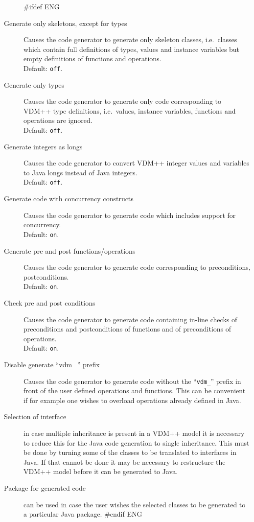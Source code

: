 \documentclass[\pformat,12pt]{article}
\begin{document}
\begin{description}

#ifdef ENG
\item[Generate only skeletons, except for types] Causes the code
  generator to generate only skeleton classes, i.e.\ classes which
  contain full definitions of types, values and instance variables but
  empty definitions of functions and operations. \\
  Default: \texttt{off}.
\item[Generate only types] Causes the code generator to generate only
  code corresponding to VDM++ type definitions, i.e.\ values, instance
  variables, functions and operations are ignored. \\
  Default: \texttt{off}.
\item[Generate integers as longs] Causes the code generator to convert
  VDM++ integer values and variables to Java longs instead of Java
  integers. \\
  Default: \texttt{off}.
\item[Generate code with concurrency constructs] Causes the code
  generator to generate code which includes support for concurrency. \\
  Default: \texttt{on}.
\item[Generate pre and post functions/operations] Causes the code
  generator to generate code corresponding to preconditions,
  postconditions. \\
  Default: \texttt{on}.
\item[Check pre and post conditions] Causes the code
  generator to generate code containing in-line checks of
  preconditions and postconditions of functions and of preconditions
  of operations. \\
  Default: \texttt{on}.
\item[Disable generate ``vdm\_'' prefix] Causes the code
  generator to generate code without the ``\texttt{vdm\_}'' prefix in
  front of the user defined operations and functions. This can be
  convenient if for example one wishes to overload operations already
  defined in Java.
\item[Selection of interface] in case multiple inheritance is present in
  a VDM++ model it is necessary to reduce this for the Java code
  generation to single inheritance. This must be done by turning some
  of the classes to be translated to interfaces in Java. If that
  cannot be done it may be necessary to restructure the VDM++ model
  before it can be generated to Java.
\item[Package for generated code] can be used in case the user wishes
  the selected classes to be generated to a particular Java package.
#endif ENG


\end{description}
\end{document}
